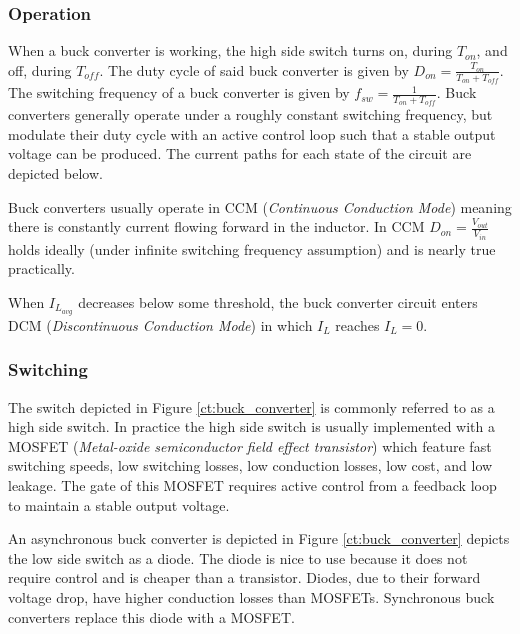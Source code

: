 \documentclass[main.tex]{subfiles}
\begin{document}
\subsubsection{Operation}
When a buck converter is working, the high side switch turns on, during $T_{on}$, and off, during $T_{off}$. The duty cycle of said buck converter is given by $D_{on} = \frac{T_{on}}{T_{on} + T_{off}}$. The switching frequency of a buck converter is given by $f_{sw} = \frac{1}{T_{on} + T_{off}}$. Buck converters generally operate under a roughly constant switching frequency, but modulate their duty cycle with an active control loop such that a stable output voltage can be produced. The current paths for each state of the circuit are depicted below. 



Buck converters usually operate in CCM (\textit{Continuous Conduction Mode}) meaning there is constantly current flowing forward in the inductor. In CCM $D_{on} = \frac{V_{out}}{V_{in}}$ holds ideally (under infinite switching frequency assumption) and is nearly true practically. 


When $I_{L_{avg}}$ decreases below some threshold, the buck converter circuit enters DCM (\textit{Discontinuous Conduction Mode}) in which $I_L$ reaches $I_L = 0$.



\subsubsection{Switching}
The switch depicted in Figure \ref{ct:buck_converter} is commonly referred to as a high side switch. In practice the high side switch is usually implemented with a MOSFET (\textit{Metal-oxide semiconductor field effect transistor}) which feature fast switching speeds, low switching losses, low conduction losses, low cost, and low leakage. The gate of this MOSFET requires active control from a feedback loop to maintain a stable output voltage.

An asynchronous buck converter is depicted in Figure \ref{ct:buck_converter} depicts the low side switch as a diode. The diode is nice to use because it does not require control and is cheaper than a transistor. Diodes, due to their forward voltage drop, have higher conduction losses than MOSFETs. Synchronous buck converters replace this diode with a MOSFET. 
\end{document}
